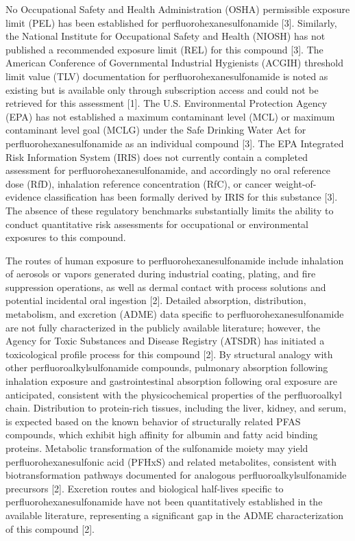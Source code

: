 No Occupational Safety and Health Administration (OSHA) permissible exposure limit (PEL) has been established for perfluorohexanesulfonamide [3]. Similarly, the National Institute for Occupational Safety and Health (NIOSH) has not published a recommended exposure limit (REL) for this compound [3]. The American Conference of Governmental Industrial Hygienists (ACGIH) threshold limit value (TLV) documentation for perfluorohexanesulfonamide is noted as existing but is available only through subscription access and could not be retrieved for this assessment [1]. The U.S. Environmental Protection Agency (EPA) has not established a maximum contaminant level (MCL) or maximum contaminant level goal (MCLG) under the Safe Drinking Water Act for perfluorohexanesulfonamide as an individual compound [3]. The EPA Integrated Risk Information System (IRIS) does not currently contain a completed assessment for perfluorohexanesulfonamide, and accordingly no oral reference dose (RfD), inhalation reference concentration (RfC), or cancer weight-of-evidence classification has been formally derived by IRIS for this substance [3]. The absence of these regulatory benchmarks substantially limits the ability to conduct quantitative risk assessments for occupational or environmental exposures to this compound.

The routes of human exposure to perfluorohexanesulfonamide include inhalation of aerosols or vapors generated during industrial coating, plating, and fire suppression operations, as well as dermal contact with process solutions and potential incidental oral ingestion [2]. Detailed absorption, distribution, metabolism, and excretion (ADME) data specific to perfluorohexanesulfonamide are not fully characterized in the publicly available literature; however, the Agency for Toxic Substances and Disease Registry (ATSDR) has initiated a toxicological profile process for this compound [2]. By structural analogy with other perfluoroalkylsulfonamide compounds, pulmonary absorption following inhalation exposure and gastrointestinal absorption following oral exposure are anticipated, consistent with the physicochemical properties of the perfluoroalkyl chain. Distribution to protein-rich tissues, including the liver, kidney, and serum, is expected based on the known behavior of structurally related PFAS compounds, which exhibit high affinity for albumin and fatty acid binding proteins. Metabolic transformation of the sulfonamide moiety may yield perfluorohexanesulfonic acid (PFHxS) and related metabolites, consistent with biotransformation pathways documented for analogous perfluoroalkylsulfonamide precursors [2]. Excretion routes and biological half-lives specific to perfluorohexanesulfonamide have not been quantitatively established in the available literature, representing a significant gap in the ADME characterization of this compound [2].

